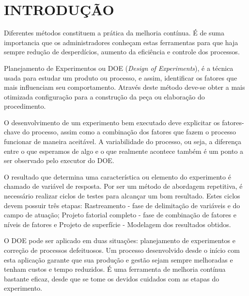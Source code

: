 \chapter{INTRODUÇÃO}
    Diferentes métodos constituem a prática da melhoria contínua. É de suma importancia que os administradores conheçam estas ferramentas para que haja sempre redução de desperdícios, aumento da eficiência e controle dos processos.

    Planejamento de Experimentos ou DOE (\textit{Design of Experiments}), é a técnica usada para estudar um produto ou processo, e assim, identificar os fatores que mais influenciam seu comportamento. Através deste método deve-se obter a mais otimizada configuração para a construção da peça ou elaboração do procedimento.

    O desenvolvimento de um experimento bem executado deve explicitar os fatores-chave do processo, assim como a combinação dos fatores que fazem o processo funcionar de maneira aceitável. A variabilidade do processo, ou seja, a diferença entre o que esperamos de algo e o que realmente acontece também é um ponto a ser observado pelo executor do DOE.

    O resultado que determina uma característica ou elemento do experimento é chamado de variável de resposta. Por ser um método de abordagem repetitiva, é necessário realizar ciclos de testes para alcançar um bom resultado. Estes ciclos devem possuir três etapas: Rastreamento - fase de delimitação de variáveis e do campo de atuação; Projeto fatorial completo - fase de combinação de fatores e níveis de fatores e Projeto de superfície - Modelagem dos resultados obtidos.   

    O DOE pode ser aplicado em duas situações: planejamento de experimentos e correção de processos defeituosos. Um processo desenvolvido desde o início com esta aplicação garante que sua produção e gestão sejam sempre melhoradas e tenham custos e tempo reduzidos. É uma ferramenta de melhoria contínua bastante eficaz, desde que se tome os devidos cuidados com as etapas do experimento.


    
    
    


